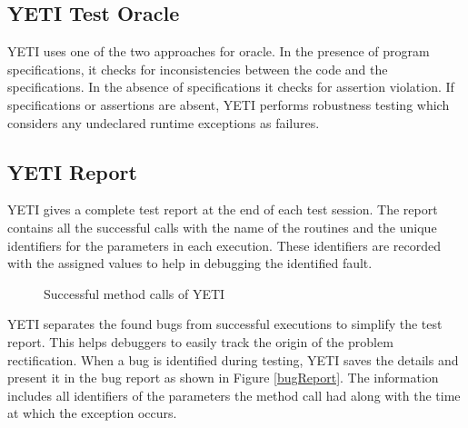 \subsection{YETI Test Oracle}
YETI uses one of the two approaches for oracle. In the presence of program specifications, it checks for inconsistencies between the code and the specifications. In the absence of specifications it checks for assertion violation.%
If specifications or assertions are absent, YETI performs robustness testing which considers any undeclared runtime exceptions as failures. 


\subsection{YETI Report}
YETI gives a complete test report at the end of each test session. The report contains all the successful calls with the name of the routines and the unique identifiers for the parameters in each execution. These identifiers are recorded with the assigned values to help in debugging the identified fault. 
\\
\begin{figure}[h]
	\centering
	\caption{Successful method calls of YETI}
\end{figure}

YETI separates the found bugs from successful executions to simplify the test report. This helps debuggers to easily track the origin of the problem rectification. When a bug is identified during testing, YETI saves the details and present it in the bug report as shown in Figure \ref{bugReport}. The information includes all identifiers of the parameters the method call had along with the time at which the exception occurs.

